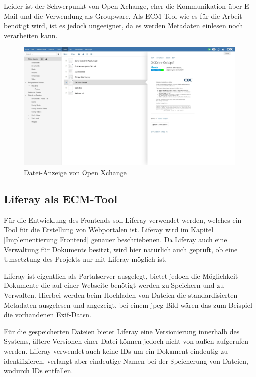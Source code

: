 Leider ist der Schwerpunkt von Open Xchange, eher die Kommunikation \"uber E-Mail und die Verwendung als Groupware. Als \ac{ECM}-Tool wie es f\"ur die Arbeit ben\"otigt wird, ist es jedoch ungeeignet, da es werden Metadaten einlesen noch verarbeiten kann.

\begin{figure}[!ht]
\centering
\includegraphics[width=16cm]{Bilder/xchange_Oberflaeche.jpg}
\caption{Datei-Anzeige von Open Xchange}
\label{Xchange Dateianzeige}
\centering
\end{figure}

\FloatBarrier
\subsection{Liferay als ECM-Tool} \label{Liferay}
F\"ur die Entwicklung des Frontends soll Liferay verwendet werden, welches ein Tool f\"ur die Erstellung von Webportalen ist.
Liferay wird im Kapitel \ref{Implementierung Frontend} genauer beschriebenen.
Da Liferay auch eine Verwaltung f\"ur Dokumente besitzt, wird hier nat\"urlich auch gepr\"uft, ob eine Umsetztung des Projekts nur mit Liferay m\"oglich ist.

Liferay ist eigentlich als Portalserver ausgelegt, bietet jedoch die M\"oglichkeit Dokumente die auf einer Webseite ben\"otigt werden zu Speichern und zu Verwalten. Hierbei werden beim Hochladen von Dateien die standardisierten Metadaten ausgelesen und angezeigt, bei einem jpeg-Bild w\"aren das zum Beispiel die vorhandenen \ac{Exif}-Daten.

F\"ur die gespeicherten Dateien bietet Liferay eine Versionierung innerhalb des Systems, \"altere Versionen einer Datei k\"onnen jedoch nicht von au\ss{}en aufgerufen werden. Liferay verwendet auch keine IDs um ein Dokument eindeutig zu identifizieren, verlangt aber eindeutige Namen bei der Speicherung von Dateien, wodurch IDs entfallen.

